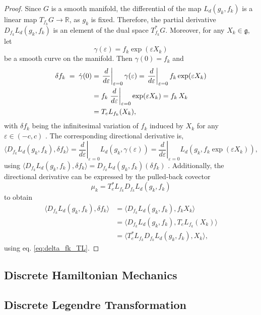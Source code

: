 \begin{proof}
Since $G$ is a smooth manifold, the differential of the map $L_d(g_k,f_k)$ is a linear map
$T_{f_k}G\to\mathbb R$, as $g_k$ is fixed. Therefore, the partial derivative
$D_{f_k}L_d(g_k,f_k)$ is an element of the dual space $T_{f_k}^*G$. Moreover, for any
$X_k \in \mathfrak g$, let
\[
\gamma(\varepsilon)=f_k\exp{(\varepsilon X_k)}
\]
be a smooth curve on the manifold. Then
$\gamma(0)=f_k$ and
\begin{align} \label{eq:delta_fk_TL}
\delta f_k \;=\; \dot\gamma(0)
&= \left.\frac{d}{d\varepsilon}\right|_{\varepsilon=0}\gamma(\varepsilon)
= \left.\frac{d}{d\varepsilon}\right|_{\varepsilon=0} f_k\exp(\varepsilon X_k) \notag\\
&= f_k\left.\frac{d}{d\varepsilon}\right|_{\varepsilon=0}\exp(\varepsilon X_k)
= f_k\,X_k \notag\\
&= T_eL_{f_k}(X_k),
\end{align}
with $\delta f_k$ being the infinitesimal variation of $f_k$ induced by $X_k$ for any
$\varepsilon \in (-c,c)$ \cite{Lee2008}. The corresponding directional derivative is,
\[
\langle D_{f_k}L_d(g_k,f_k),\delta f_k\rangle
=
\left.\frac{d}{d\varepsilon}\right|_{\varepsilon=0}L_d(g_k,\gamma(\varepsilon))
=
\left.\frac{d}{d\varepsilon}\right|_{\varepsilon=0}L_d(g_k,f_k\exp{(\varepsilon X_k)}),
\]
using $\langle D_{f_k}L_d(g_k,f_k),\delta f_k \rangle = D_{f_k}L_d(g_k,f_k)(\delta f_k)$ \cite{Lee2008}. Additionally, the directional derivative can be expressed by the pulled-back covector
\[
\mu_k = T_e^* L_{f_k} D_{f_k}L_d(g_k,f_k)
\]
to obtain
\begin{align*}    
\langle D_{f_k}L_d(g_k,f_k),\delta f_k\rangle
&= \langle D_{f_k}L_d(g_k,f_k),f_k X_k \rangle \\
&= \langle D_{f_k}L_d(g_k,f_k), T_eL_{f_k}(X_k) \rangle \\
&= \langle T_e ^* L_{f_k} D_{f_k}L_d(g_k,f_k), X_k \rangle,
\end{align*}
using eq. \eqref{eq:delta_fk_TL}.
\end{proof}

\subsection{Discrete Hamiltonian Mechanics}

\subsection{Discrete Legendre Transformation}
\label{sec:discrete_legendre_transformation}

